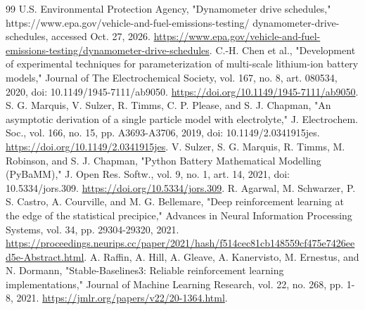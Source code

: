\documentclass[conference]{IEEEtran}
\begin{document}
\begin{thebibliography}{99}
 U.S. Environmental Protection Agency, "Dynamometer drive schedules," https://www.epa.gov/vehicle-and-fuel-emissions-testing/ dynamometer-drive-schedules, accessed Oct. 27, 2026. \url{https://www.epa.gov/vehicle-and-fuel-emissions-testing/dynamometer-drive-schedules}.
 C.-H. Chen et al., "Development of experimental techniques for parameterization of multi-scale lithium-ion battery models," Journal of The Electrochemical Society, vol. 167, no. 8, art. 080534, 2020, doi: 10.1149/1945-7111/ab9050. \url{https://doi.org/10.1149/1945-7111/ab9050}.
 S. G. Marquis, V. Sulzer, R. Timms, C. P. Please, and S. J. Chapman, "An asymptotic derivation of a single particle model with electrolyte," J. Electrochem. Soc., vol. 166, no. 15, pp. A3693-A3706, 2019, doi: 10.1149/2.0341915jes. \url{https://doi.org/10.1149/2.0341915jes}.
 V. Sulzer, S. G. Marquis, R. Timms, M. Robinson, and S. J. Chapman, "Python Battery Mathematical Modelling (PyBaMM)," J. Open Res. Softw., vol. 9, no. 1, art. 14, 2021, doi: 10.5334/jors.309. \url{https://doi.org/10.5334/jors.309}.
 R. Agarwal, M. Schwarzer, P. S. Castro, A. Courville, and M. G. Bellemare, "Deep reinforcement learning at the edge of the statistical precipice," Advances in Neural Information Processing Systems, vol. 34, pp. 29304-29320, 2021. \url{https://proceedings.neurips.cc/paper/2021/hash/f514cec81cb148559cf475e7426eed5e-Abstract.html}.
 A. Raffin, A. Hill, A. Gleave, A. Kanervisto, M. Ernestus, and N. Dormann, "Stable-Baselines3: Reliable reinforcement learning implementations," Journal of Machine Learning Research, vol. 22, no. 268, pp. 1-8, 2021. \url{https://jmlr.org/papers/v22/20-1364.html}.
\end{thebibliography}
\end{document}
